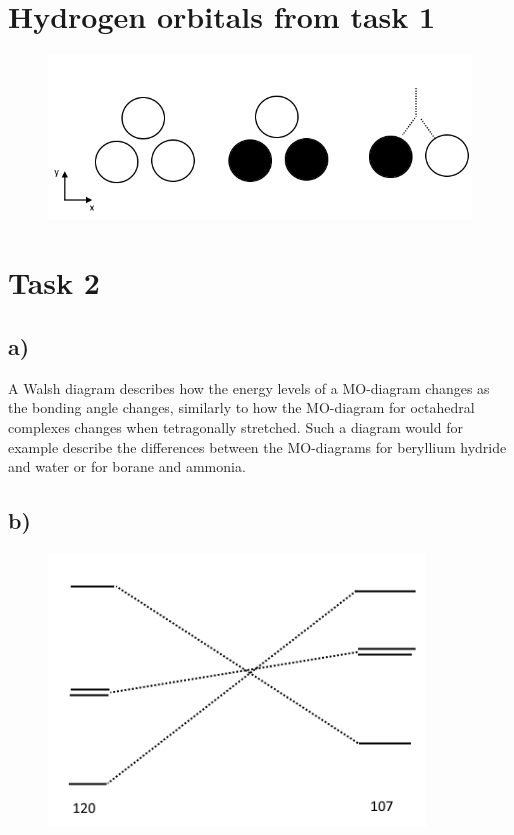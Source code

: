 \section*{Hydrogen orbitals from task 1}

\begin{figure}[!htb]
	\centering
	\includegraphics[width = 15cm]{Figurer/h3.png}
\end{figure}


\newpage


\section*{Task 2}

\subsection*{a)}

A Walsh diagram describes how the energy levels of a MO-diagram changes as the bonding angle changes, similarly to how the MO-diagram for octahedral complexes changes when tetragonally stretched. Such a diagram would for example describe the differences between the MO-diagrams for beryllium hydride and water or for borane and ammonia.


\subsection{b)}

\begin{figure}[!htb]
	\centering
	\includegraphics[width = 10cm]{Figurer/walsh.png}
\end{figure}

